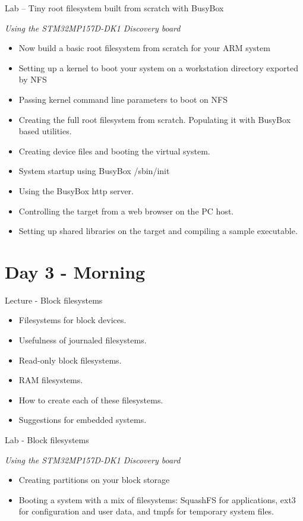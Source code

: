 \documentclass[a4paper,12pt,obeyspaces,spaces,hyphens]{article}
\begin{document}
\feagendaonecolumn
{Lab – Tiny root filesystem built from scratch with BusyBox}
{
  {\em Using the STM32MP157D-DK1 Discovery board}
  \begin{itemize}
  \item Now build a basic root filesystem from scratch for your ARM system
  \item Setting up a kernel to boot your system on a workstation
        directory exported by NFS
  \item Passing kernel command line parameters to boot on NFS
  \item Creating the full root filesystem from scratch.
        Populating it with BusyBox based utilities.
  \item Creating device files and booting the virtual system.
  \item System startup using BusyBox /sbin/init
  \item Using the BusyBox http server.
  \item Controlling the target from a web browser on the PC host.
  \item Setting up shared libraries on the target and compiling
        a sample executable.
  \end{itemize}
}

\section{Day 3 - Morning}

\feagendatwocolumn
{Lecture - Block filesystems}
{
  \begin{itemize}
  \item Filesystems for block devices.
  \item Usefulness of journaled filesystems.
  \item Read-only block filesystems.
  \item RAM filesystems.
  \item How to create each of these filesystems.
  \item Suggestions for embedded systems.
  \end{itemize}
}
{Lab - Block filesystems}
{
  {\em Using the STM32MP157D-DK1 Discovery board}
  \begin{itemize}
  \item Creating partitions on your block storage
  \item Booting a system with a mix of filesystems: SquashFS for
	applications, ext3 for configuration and user data, and
	tmpfs for temporary system files.
  \end{itemize}
}
\end{document}
